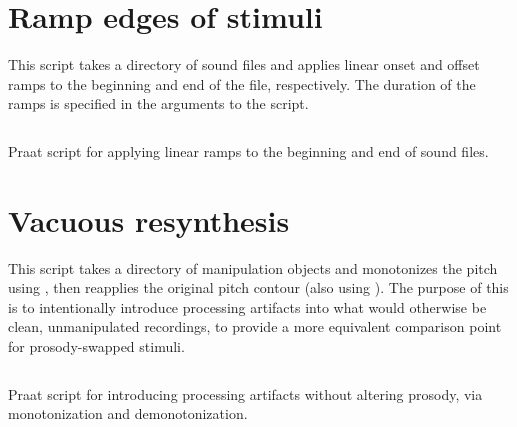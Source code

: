\section{Ramp edges of stimuli}
This script takes a directory of sound files and applies linear onset and offset ramps to the beginning and end of the file, respectively.  The duration of the ramps is specified in the arguments to the script. 
\begin{code}
	\inputminted[fontsize=\footnotesize, tabsize=2]{r}{../scripts/dissversions/RampEdges_DissVersion.praat}
	\caption[Ramp edges of stimuli]{Praat script for applying linear ramps to the beginning and end of sound files.\label{lst:RampEdges}}
\end{code}
\newpage

\section{Vacuous resynthesis}
This script takes a directory of manipulation objects and monotonizes the pitch using \psola, then reapplies the original pitch contour (also using \psola).  The purpose of this is to intentionally introduce processing artifacts into what would otherwise be clean, unmanipulated recordings, to provide a more equivalent comparison point for prosody-swapped stimuli. 
\begin{code}
	\inputminted[fontsize=\footnotesize, tabsize=2]{r}{../scripts/dissversions/VacuousResynthesis_DissVersion.praat}
	\caption[Vacuous resynthesis]{Praat script for introducing processing artifacts without altering prosody, via monotonization and demonotonization.\label{lst:VacResynth}}
\end{code}

